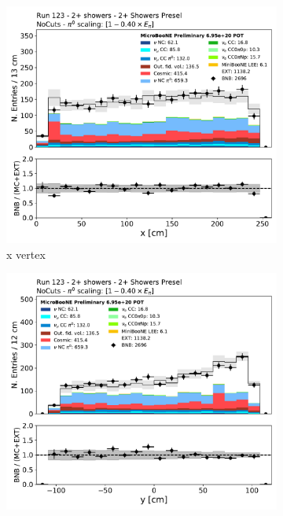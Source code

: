 \begin{figure}[H]
    \centering
    \begin{subfigure}{0.3\textwidth}
    \includegraphics[width=1.0\textwidth]{Sidebands/Figures/TwoShr_1e0pSel/Presel/reco_nu_vtx_x.pdf}
    \caption{x vertex}
    \end{subfigure}
    \begin{subfigure}{0.3\textwidth}
    \includegraphics[width=1.0\textwidth]{Sidebands/Figures/TwoShr_1e0pSel/Presel/reco_nu_vtx_y.pdf}

\end{subfigure}
\end{figure}
